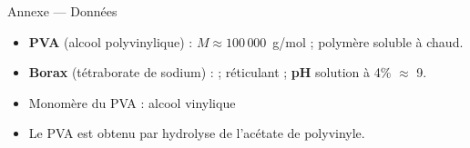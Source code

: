 \documentclass[11pt,a4paper]{article}
\newcommand{\sectitle}[1]{%
  \vspace{6pt}
  \noindent\colorbox{exoheader}{\parbox{\dimexpr\linewidth-2\fboxsep}%
    {\color{white}\bfseries\large\strut\quad #1}}
  \vspace{4pt}
}
\begin{document}
\vspace{0.3cm}\noindent\dotfill

\vspace{0.3cm}\noindent\dotfill

\sectitle{Annexe --- Données}

\begin{mdframed}[backgroundcolor=exolight, linecolor=exoheader, linewidth=1.2pt]
\begin{itemize}
  \item \textbf{PVA} (alcool polyvinylique) : $M \approx 100\,000$~g/mol ; polymère soluble à chaud.
  \item \textbf{Borax} (tétraborate de sodium) :  ; réticulant ; \textbf{pH} solution à 4\% $\approx$ 9.
  \item Monomère du PVA : alcool vinylique 
  \item Le PVA est obtenu par hydrolyse de l'acétate de polyvinyle.
\end{itemize}
\end{mdframed}
\end{document}
